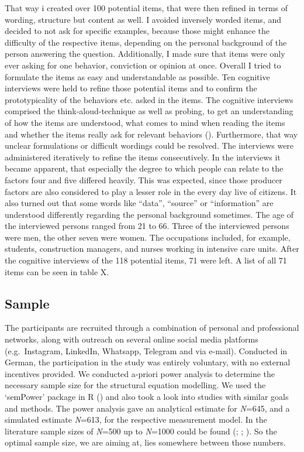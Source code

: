 \documentclass[
  12pt,
  a4paper,
  twoside]{article}
\begin{document}
That way i created over 100 potential items, that were then refined in terms of wording, structure but content as well.
I avoided inversely worded items, and decided to not ask for specific examples, because those might enhance the difficulty of the respective items, depending on the personal background of the person answering the question.
Additionally, I made sure that items were only ever asking for one behavior, conviction or opinion at once.
Overall I tried to formulate the items as easy and understandable as possible.
Ten cognitive interviews were held to refine those potential items and to confirm the prototypicality of the behaviors etc. asked in the items.
The cognitive interviews comprised the think-aloud-technique as well as probing, to get an understanding of how the items are understood, what comes to mind when reading the items and whether the items really ask for relevant behaviors (). Furthermore, that way unclear formulations or difficult wordings could be resolved.
The interviews were administered iteratively to refine the items consecutively.
In the interviews it became apparent, that especially the degree to which people can relate to the factors four and five differed heavily. This was expected, since those producer factors are also considered to play a lesser role in the every day live of citizens. It also turned out that some words like ``data'', ``source'' or ``information'' are understood differently regarding the personal background sometimes.
The age of the interviewed persons ranged from 21 to 66. Three of the interviewed persons were men, the other seven were women. The occupations included, for example, students, construction managers, and nurses working in intensive care units. After the cognitive interviews of the 118 potential items, 71 were left. A list of all 71 items can be seen in table X.

\subsection{Sample}\label{sample}

The participants are recruited through a combination of personal and professional networks, along with outreach on several online social media platforms (e.g.~Instagram, LinkedIn, Whatsapp, Telegram and via e-mail). Conducted in German, the participation in the study was entirely voluntary, with no external incentives provided. We conducted a-priori power analysis to determine the necessary sample size for the structural equation modelling. We used the `semPower' package in R () and also took a look into studies with similar goals and methods. The power analysis gave an analytical estimate for \emph{N}=645, and a simulated estimate \emph{N}=613, for the respective measurement model. In the literature sample sizes of \emph{N}=500 up to \emph{N}=1000 could be found (; ; ). So the optimal sample size, we are aiming at, lies somewhere between those numbers.
\end{document}
